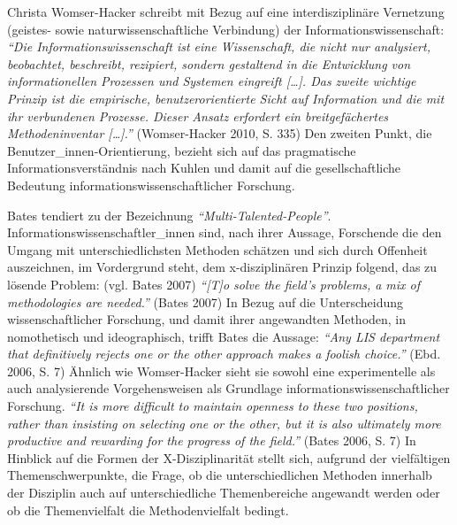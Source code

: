 \documentclass[a4paper,
fontsize=11pt,
oneside,
numbers=noperiodatend,
parskip=half-,
bibliography=totoc,
final
]{scrartcl}
\begin{document}
Christa Womser-Hacker schreibt mit Bezug auf eine interdisziplinäre
Vernetzung (geistes- sowie naturwissenschaftliche Verbindung) der
Informationswissenschaft: \emph{\enquote{Die Informationswissenschaft
ist eine Wissenschaft, die nicht nur analysiert, beobachtet, beschreibt,
rezipiert, sondern gestaltend in die Entwicklung von informationellen
Prozessen und Systemen eingreift {[}\ldots{}{]}. Das zweite wichtige
Prinzip ist die empirische, benutzerorientierte Sicht auf Information
und die mit ihr verbundenen Prozesse. Dieser Ansatz erfordert ein
breitgefächertes Methodeninventar {[}\ldots{}{]}.}} (Womser-Hacker 2010,
S. 335) Den zweiten Punkt, die Benutzer\_innen-Orientierung, bezieht
sich auf das pragmatische Informationsverständnis nach Kuhlen und damit
auf die gesellschaftliche Bedeutung informationswissenschaftlicher
Forschung.

Bates tendiert zu der Bezeichnung
\emph{\enquote{Multi-Talented-People}}.
Informationswissenschaftler\_innen sind, nach ihrer Aussage, Forschende
die den Umgang mit unterschiedlichsten Methoden schätzen und sich durch
Offenheit auszeichnen, im Vordergrund steht, dem x-disziplinären Prinzip
folgend, das zu lösende Problem: (vgl. Bates 2007)
\emph{\enquote{{[}T{]}o solve the field's problems, a mix of
methodologies are needed.}} (Bates 2007) In Bezug auf die Unterscheidung
wissenschaftlicher Forschung, und damit ihrer angewandten Methoden, in
nomothetisch und ideographisch, trifft Bates die Aussage:
\emph{\enquote{Any LIS department that definitively rejects one or the
other approach makes a foolish choice.}} (Ebd. 2006, S. 7) Ähnlich wie
Womser-Hacker sieht sie sowohl eine experimentelle als auch
analysierende Vorgehensweisen als Grundlage
informationswissenschaftlicher Forschung. \emph{\enquote{It is more
difficult to maintain openness to these two positions, rather than
insisting on selecting one or the other, but it is also ultimately more
productive and rewarding for the progress of the field.}} (Bates 2006,
S. 7) In Hinblick auf die Formen der X-Disziplinarität stellt sich,
aufgrund der vielfältigen Themenschwerpunkte, die Frage, ob die
unterschiedlichen Methoden innerhalb der Disziplin auch auf
unterschiedliche Themenbereiche angewandt werden oder ob die
Themenvielfalt die Methodenvielfalt bedingt.
\end{document}
